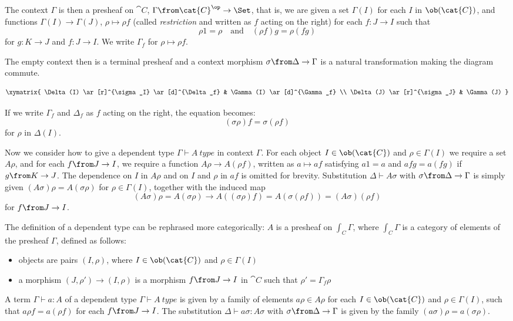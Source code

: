 The context $\Gamma$ is then a presheaf on $\cat{C}$, $\Gamma \from
\cat{C}^\op \to \Set$, that is, we are given a set $\Gamma(I)$ for each
$I$ in $\ob(\cat{C})$, and functions $\Gamma(I) \to \Gamma(J)$, $\rho \mapsto \rho
f$ (called \emph{restriction} and written as $f$ acting on the right) for each
$f: J \to I$ such that
\[
  \rho 1 = \rho \quad \text{and} \quad (\rho f) g = \rho (f g)
\]
for $g: K \to J$ and $f: J \to I$. We write $\Gamma_f$ for $\rho \mapsto \rho
f$.

The empty context then is a terminal presheaf and a context morphism $\sigma
\from \Delta \to \Gamma$ is a natural transformation making the diagram
commute.

\[
  \xymatrix{
    \Delta(I) \ar[r]^{\sigma_I} \ar[d]^{\Delta_f} & \Gamma(I) \ar[d]^{\Gamma_f} \\
    \Delta(J) \ar[r]^{\sigma_J} & \Gamma(J)
  }
\]

If we write $\Gamma_f$ and $\Delta_f$ as $f$ acting on the right, the
equation becomes:
\[
  (\sigma \rho) f = \sigma (\rho f)
\]
for $\rho$ in $\Delta(I)$.

Now we consider how to give a dependent type $\Gamma \vdash A~type$ in context
$\Gamma$. For each object $I \in \ob(\cat{C})$ and $\rho \in \Gamma(I)$ we require a
set $A \rho$, and for each $f \from J \to I$, we require a function $A \rho \to
A (\rho f)$, written as $a \mapsto af$ satisfying $a1 = a$ and $afg = a (f g)$
if $g \from K \to J$. The dependence on $I$ in $A\rho$ and on $I$ and $\rho$ in
$af$ is omitted for brevity. Substitution $\Delta \vdash A \sigma$ with $\sigma
\from \Delta \to \Gamma$ is simply given $(A \sigma) \rho = A (\sigma \rho)$
for $\rho \in \Gamma(I)$, together with the induced map
\[
  (A\sigma)\rho = A (\sigma \rho) \to A ((\sigma \rho)f) = A (\sigma (\rho f)) = (A \sigma) (\rho f)
\]
for $f \from J \to I$.

The definition of a dependent type can be rephrased more categorically: $A$ is
a presheaf on $\int_C \Gamma$, where $\int_C \Gamma$ is a category of elements
of the presheaf $\Gamma$, defined as follows:
\begin{itemize}
  \item objects are pairs $(I, \rho)$, where $I \in \ob(\cat{C})$ and $\rho \in
    \Gamma(I)$
  \item a morphism $(J, \rho') \to (I, \rho)$ is a morphism $f \from J \to I$
    in $\cat{C}$ such that $\rho' = \Gamma_f \rho$
\end{itemize}

A term $\Gamma \vdash a : A$ of a dependent type $\Gamma \vdash A~type$ is
given by a family of elements $a \rho \in A \rho$ for each $I \in \ob(\cat{C})$
and $\rho \in \Gamma(I)$, such that $a \rho f = a (\rho f)$ for each $f \from J
\to I$. The substitution $\Delta \vdash a \sigma : A \sigma$ with $\sigma \from
\Delta \to \Gamma$ is given by the family $(a \sigma) \rho = a (\sigma \rho)$.

